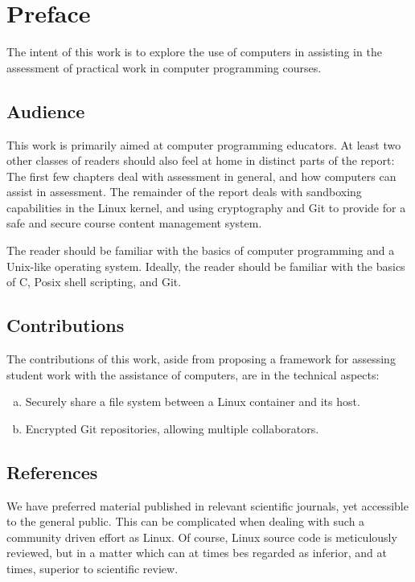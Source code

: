 
\chapter{Preface}

The intent of this work is to explore the use of computers in assisting in the
assessment of practical work in computer programming courses.

\section{Audience}

This work is primarily aimed at computer programming educators. At least two
other classes of readers should also feel at home in distinct parts of the
report: The first few chapters deal with assessment in general, and how
computers can assist in assessment. The remainder of the report deals with
sandboxing capabilities in the Linux kernel, and using cryptography and Git to
provide for a safe and secure course content management system.

The reader should be familiar with the basics of computer programming and a
Unix-like operating system. Ideally, the reader should be familiar with the
basics of C, Posix shell scripting, and Git.

\section{Contributions}

The contributions of this work, aside from proposing a framework for assessing
student work with the assistance of computers, are in the technical aspects:

\begin{enumerate}[(a)]

\item Securely share a file system between a Linux container and its host.

\item Encrypted Git repositories, allowing multiple collaborators.

\end{enumerate}

\section{References}

We have preferred material published in relevant scientific journals, yet
accessible to the general public. This can be complicated when dealing with
such a community driven effort as Linux. Of course, Linux source code is
meticulously reviewed, but in a matter which can at times bes regarded as
inferior, and at times, superior to scientific review.

